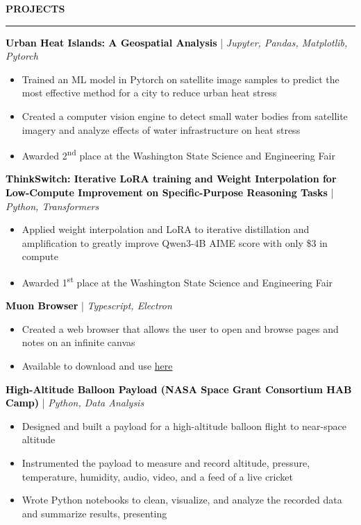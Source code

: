 \documentclass[8pt,a4paper]{altacv}
\newcommand{\resumebodysize}{\fontsize{8pt}{9pt}\selectfont}
\renewcommand{\divider}{\textcolor{body!30}{\hdashrule{\linewidth}{0.6pt}{0.285em}}\vspace{4.096pt}}
\newcommand{\projectdivider}{\vskip-1.937pt\divider}
\renewcommand{\cvsection}[2][]{%
  \bigskip%
  \vspace{3.686pt}%
  \ifstrequal{#1}{}{}{\marginpar{\vspace*{\dimexpr1pt-\baselineskip}\raggedright}}%
  {\color{heading}\large\bfseries\MakeUppercase{#2}}\\[-1ex]\vspace{1.489pt}%
  {\color{heading}\rule{\linewidth}{2pt}\par}\medskip\vspace{1.179pt}
}
\renewcommand{\cvevent}[4]{%
  {\fontsize{9pt}{9pt}\selectfont\color{black}\hspace*{-0.282pt}#1\par}
  \ifstrequal{#2}{}{}{%
    \vspace{2.144pt}
    {\fontsize{9pt}{9pt}\selectfont\textbf{\color{accent}#2}\hspace{0.5em}\resumebodysize\faCalendar\hspace{0.5em}#3\par}%
  }%
  \vspace{2.145pt}\resumebodysize
}
\begin{document}
\vskip-4.265pt
\cvsection{Projects}
\vskip-1.479pt

\cvevent{\textcolor{black}{\textbf{Urban Heat Islands: A Geospatial Analysis}} \textnormal{| \textit{Jupyter, Pandas, Matplotlib, Pytorch}}}{}{}{}
\begin{itemize}
\item Trained an ML model in Pytorch on satellite image samples to predict the most effective method for a city to reduce urban heat stress
\item Created a computer vision engine to detect small water bodies from satellite imagery and analyze effects of water infrastructure on heat stress
\item Awarded 2\textsuperscript{nd} place at the Washington State Science and Engineering Fair
\end{itemize}
\projectdivider

\cvevent{\textcolor{black}{\textbf{ThinkSwitch: Iterative LoRA training and Weight Interpolation for Low-Compute Improvement on Specific-Purpose Reasoning Tasks}} \textnormal{| \textit{Python, Transformers}}}{}{}{}
\begin{itemize}
\item Applied weight interpolation and LoRA to iterative distillation and amplification to greatly improve Qwen3-4B AIME score with only \$3 in compute
\item Awarded 1\textsuperscript{st} place at the Washington State Science and Engineering Fair
\end{itemize}
\divider

\cvevent{\textcolor{black}{\textbf{Muon Browser}} \textnormal{| \textit{Typescript, Electron}}}{}{}{}
\begin{itemize}
\item Created a web browser that allows the user to open and browse pages and notes on an infinite canvas
\item Available to download and use \href{http://github.com/oof-baroomf/muon}{here}
\end{itemize}
\divider

\cvevent{\textcolor{black}{\textbf{High-Altitude Balloon Payload (NASA Space Grant Consortium HAB Camp)}} \textnormal{| \textit{Python, Data Analysis}}}{}{}{}
\begin{itemize}
\item Designed and built a payload for a high-altitude balloon flight to near-space altitude
\item Instrumented the payload to measure and record altitude, pressure, temperature, humidity, audio, video, and a feed of a live cricket
\item Wrote Python notebooks to clean, visualize, and analyze the recorded data and summarize results, presenting
\end{itemize}
\end{document}
